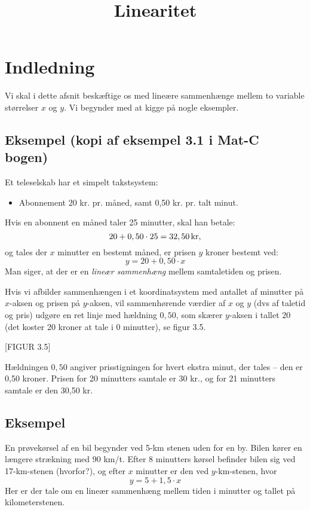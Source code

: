 \documentclass[12pt,oneside,a4paper]{article}
\title{Linearitet}
\begin{document}
\maketitle

\section{Indledning}
Vi skal i dette afsnit beskæftige os med lineære sammenhænge mellem to variable
størrelser $x$ og $y$.  Vi begynder med at kigge på nogle eksempler.

\subsection{Eksempel (kopi af eksempel 3.1 i Mat-C bogen)}
Et teleselskab har et simpelt takstsystem:
\begin{itemize}
    \item Abonnement 20 kr. pr. måned, samt 0,50 kr. pr. talt minut.
\end{itemize}
Hvis en abonnent en måned taler 25 minutter, skal han betale:
$$
20 + 0,50\cdot25 = 32,50 \, {\rm kr},
$$
og tales der $x$ minutter en bestemt måned, er prisen $y$ kroner bestemt ved:
$$
y = 20 + 0,50\cdot x
$$
Man siger, at der er en {\em lineær sammenhæng} mellem samtaletiden og prisen.

Hvis vi afbilder sammenhængen i et koordinatsystem med antallet af minutter på
$x$-aksen og prisen på $y$-aksen, vil sammenhørende værdier af $x$ og $y$ (dvs
af taletid og pris) udgøre en ret linje med hældning $0,50$, som skærer
$y$-aksen i tallet $20$ (det koster 20 kroner at tale i 0 minutter), se figur
3.5.

[FIGUR 3.5]

Hældningen $0,50$ angiver prisstigningen for hvert ekstra minut, der tales --
den er 0,50 kroner.  Prisen for 20 minutters samtale er 30 kr., og for 21
minutters samtale er den 30,50 kr.

\subsection{Eksempel}
En prøvekørsel af en bil begynder ved 5-km stenen uden for en by. Bilen kører
en længere strækning med 90 km/t. Efter 8 minutters kørsel befinder bilen sig
ved 17-km-stenen (hvorfor?), og efter $x$ minutter er den ved $y$-km-stenen,
hvor
$$
y = 5 + 1,5\cdot x
$$
Her er der tale om en lineær sammenhæng mellem tiden i minutter og tallet på
kilometerstenen.
\end{document}
